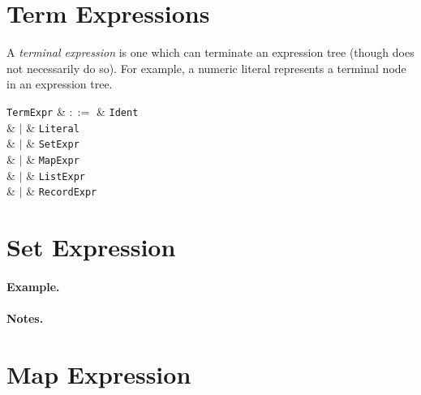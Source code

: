 \section{Term Expressions}
\label{c_expr_term}

A {\em terminal expression} is one which can terminate an expression tree (though does not necessarily do so).  For example, a numeric literal represents a terminal node in an expression tree.

\begin{syntax}
  \verb+TermExpr+ & $::=$ & \verb+Ident+\\
  & $|$ & \verb+Literal+\\
  & $|$ & \verb+SetExpr+\\
  & $|$ & \verb+MapExpr+\\
  & $|$ & \verb+ListExpr+\\
  & $|$ & \verb+RecordExpr+\\
\end{syntax}


\section{Set Expression}
\label{c_expr_set}

\begin{syntax}
\end{syntax}

\paragraph{Example.}

\paragraph{Notes.}


\section{Map Expression}
\label{c_expr_map}

\begin{syntax}
\end{syntax}

